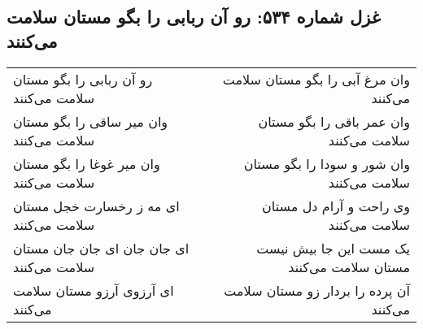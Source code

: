 \begin{center}
\section*{غزل شماره ۵۳۴: رو آن ربابی را بگو مستان سلامت می‌کنند}
\label{sec:0534}
\begin{longtable}{l p{0.5cm} r}
رو آن ربابی را بگو مستان سلامت می‌کنند
&&
وان مرغ آبی را بگو مستان سلامت می‌کنند
\\
وان میر ساقی را بگو مستان سلامت می‌کنند
&&
وان عمر باقی را بگو مستان سلامت می‌کنند
\\
وان میر غوغا را بگو مستان سلامت می‌کنند
&&
وان شور و سودا را بگو مستان سلامت می‌کنند
\\
ای مه ز رخسارت خجل مستان سلامت می‌کنند
&&
وی راحت و آرام دل مستان سلامت می‌کنند
\\
ای جان جان ای جان جان مستان سلامت می‌کنند
&&
یک مست این جا بیش نیست مستان سلامت می‌کنند
\\
ای آرزوی آرزو مستان سلامت می‌کنند
&&
آن پرده را بردار زو مستان سلامت می‌کنند
\\
\end{longtable}
\end{center}

